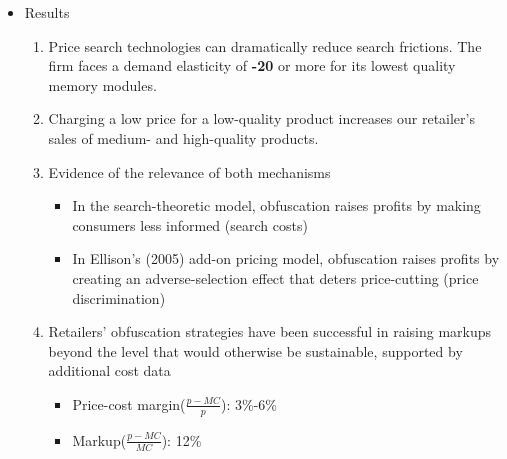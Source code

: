 \documentclass{beamer}
\begin{document}
\begin{frame}[allowframebreaks]
\begin{itemize}
\framebreak
\item Results
    \begin{enumerate}
    \item Price search technologies
can dramatically reduce search frictions. The firm
faces a demand elasticity of \textbf{-20} or more for its lowest quality memory modules.
    \item Charging a low price for a low-quality product
      increases our retailer's sales of medium- and high-quality products.
    
\framebreak
    
    \item Evidence of the relevance of both mechanisms
      \begin{itemize}
      \item In the search-theoretic model, obfuscation raises profits by making consumers less informed (search costs)
      \item In Ellison's (2005) add-on pricing model, obfuscation raises profits by creating an adverse-selection effect that deters price-cutting (price discrimination)
      \end{itemize}
      
    \item Retailers' obfuscation strategies have been successful in raising markups beyond the level that would otherwise be sustainable, supported by additional cost data
        \begin{itemize}
        \item Price-cost margin($\frac{p-MC}{p}$): 3\%-6\%
        \item Markup($\frac{p-MC}{MC}$): 12\%
        \end{itemize}
    \end{enumerate}
\end{itemize}
\end{frame}
\end{document}
